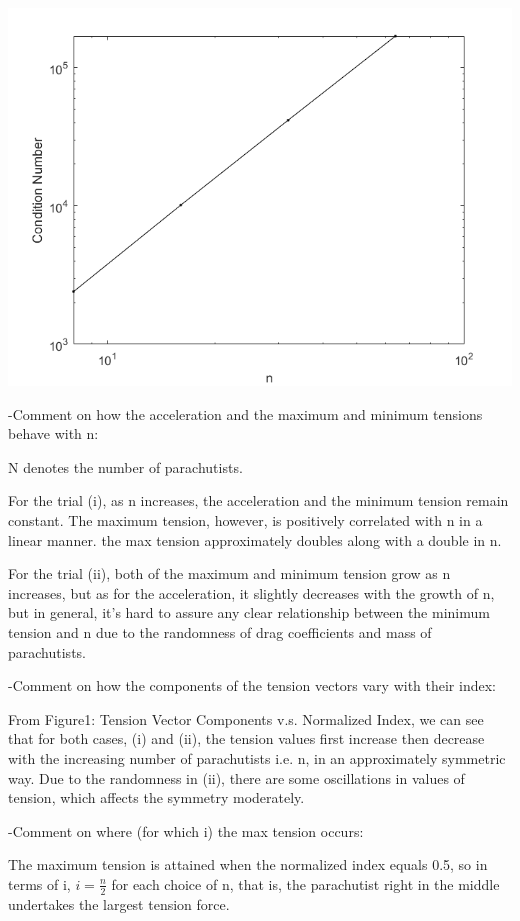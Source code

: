 \documentclass[12pt]{article}
\begin{document}
\includegraphics[scale=0.5]{Q2a_loglog.png}

-Comment on how the acceleration and the maximum and minimum tensions behave with n:

N denotes the number of parachutists.

For the trial (i), as n increases, the acceleration and the minimum tension remain constant. The maximum tension, however, is positively correlated with n in a linear manner. the max tension approximately doubles along with a double in n.

For the trial (ii), both of the maximum and minimum tension grow as n increases, but as for the acceleration, it slightly decreases with the growth of n, but in general, it's hard to assure any clear relationship between the minimum tension and n due to the randomness of drag coefficients and mass of parachutists.

-Comment on how the components of the tension vectors vary with their index:

From Figure1: Tension Vector Components v.s. Normalized Index, we can see that for both cases, (i) and (ii), the tension values first increase then decrease with the increasing number of parachutists i.e. n, in an approximately symmetric way. Due to the randomness in (ii), there are some oscillations in values of tension, which affects the symmetry moderately.

-Comment on where (for which i) the max tension occurs:

The maximum tension is attained when the normalized index equals 0.5, so in terms of i, $i = \frac{n}{2}$ for each choice of n, that is, the parachutist right in the middle undertakes the largest tension force.
\end{document}
